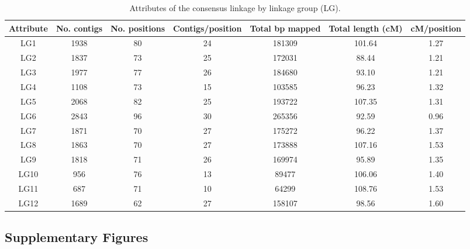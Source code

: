 \documentclass[smallextended]{svjour3}
\begin{document}
\clearpage
\begin{landscape}
\begin{table}[ht]
\caption{Attributes of the consensus linkage by linkage group (LG).} 
\begin{tabular}{ccccccc}
\toprule
Attribute & No. contigs & No. positions & Contigs/position & Total bp mapped & Total length (cM) & cM/position \\
\midrule
LG1 & 1938 & 80 & 24 & 181309 & 101.64 & 1.27 \\
LG2 & 1837 & 73 & 25 & 172031 & 88.44 & 1.21 \\
LG3 & 1977 & 77 & 26 & 184680 & 93.10 & 1.21 \\
LG4 & 1108 & 73 & 15 & 103585 & 96.23 & 1.32 \\
LG5 & 2068 & 82 & 25 & 193722 & 107.35 & 1.31 \\
LG6 & 2843 & 96 & 30 & 265356 & 92.59 & 0.96 \\
LG7 & 1871 & 70 & 27 & 175272 & 96.22 & 1.37 \\
LG8 & 1863 & 70 & 27 & 173888 & 107.16 & 1.53 \\
LG9 & 1818 & 71 & 26 & 169974 & 95.89 & 1.35 \\
LG10 & 956 & 76 & 13 & 89477 & 106.06 & 1.40 \\
LG11 & 687 & 71 & 10 & 64299 & 108.76 & 1.53 \\
LG12 & 1689 & 62 & 27 & 158107 & 98.56 & 1.60 \\
\bottomrule
\end{tabular}
\label{t:label}
\end{table}
\end{landscape}

\subsection*{Supplementary Figures}\label{ss:supp}
\end{document}
